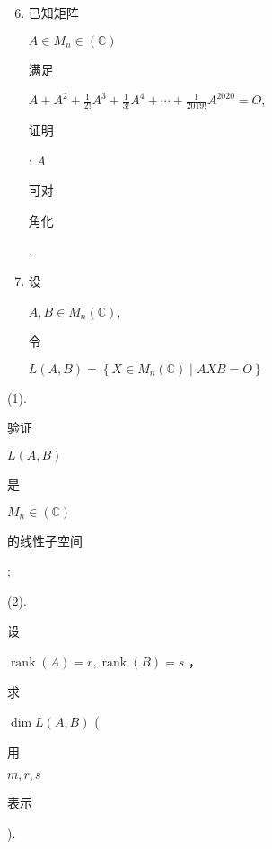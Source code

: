 \documentclass[10pt]{article}
\begin{document}
\begin{enumerate}
  \setcounter{enumi}{5}
  \item \begin{CJK}{UTF8}{mj}已知矩阵\end{CJK} $A \in M_{n} \in(\mathbb{C})$ \begin{CJK}{UTF8}{mj}满足\end{CJK} $A+A^{2}+\frac{1}{2 !} A^{3}+\frac{1}{3 !} A^{4}+\cdots+\frac{1}{2019 !} A^{2020}=O$, \begin{CJK}{UTF8}{mj}证明\end{CJK}: $A$ \begin{CJK}{UTF8}{mj}可对\end{CJK} \begin{CJK}{UTF8}{mj}角化\end{CJK}.

  \item \begin{CJK}{UTF8}{mj}设\end{CJK} $A, B \in M_{n}(\mathbb{C})$, \begin{CJK}{UTF8}{mj}令\end{CJK} $L(A, B)=\left\{X \in M_{n}(\mathbb{C}) \mid A X B=O\right\}$

\end{enumerate}
(1). \begin{CJK}{UTF8}{mj}验证\end{CJK} $L(A, B)$ \begin{CJK}{UTF8}{mj}是\end{CJK} $M_{n} \in(\mathbb{C})$ \begin{CJK}{UTF8}{mj}的线性子空间\end{CJK};

(2). \begin{CJK}{UTF8}{mj}设\end{CJK} $\operatorname{rank}(A)=r, \operatorname{rank}(B)=s$ ，\begin{CJK}{UTF8}{mj}求\end{CJK} $\operatorname{dim} L(A, B)$ (\begin{CJK}{UTF8}{mj}用\end{CJK} $m, r, s$ \begin{CJK}{UTF8}{mj}表示\end{CJK}).
\end{document}
